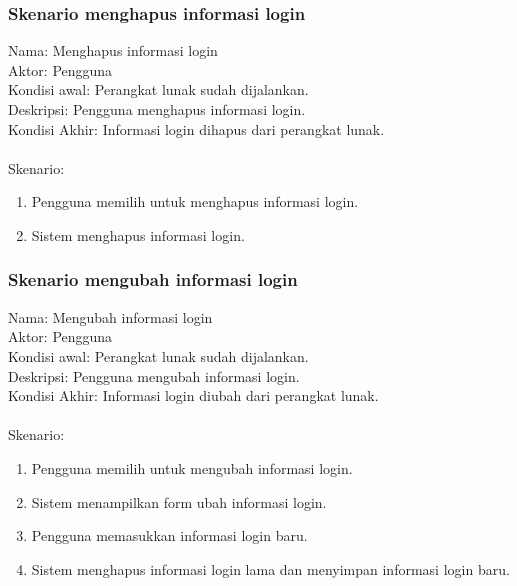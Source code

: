 \subsubsection{Skenario menghapus informasi login}
Nama: Menghapus informasi login\\
Aktor: Pengguna\\
Kondisi awal: Perangkat lunak sudah dijalankan.\\
Deskripsi: Pengguna menghapus informasi login.\\
Kondisi Akhir: Informasi login dihapus dari perangkat lunak.\\\\
Skenario:
\begin{enumerate}
    \item{Pengguna memilih untuk menghapus informasi login.}
    \item{Sistem menghapus informasi login.}
\end{enumerate}

\subsubsection{Skenario mengubah informasi login}
Nama: Mengubah informasi login\\
Aktor: Pengguna\\
Kondisi awal: Perangkat lunak sudah dijalankan.\\
Deskripsi: Pengguna mengubah informasi login.\\
Kondisi Akhir: Informasi login diubah dari perangkat lunak.\\\\
Skenario:
\begin{enumerate}
    \item{Pengguna memilih untuk mengubah informasi login.}
    \item{Sistem menampilkan form ubah informasi login.}
    \item{Pengguna memasukkan informasi login baru.}
    \item{Sistem menghapus informasi login lama dan menyimpan informasi login baru.}
\end{enumerate}